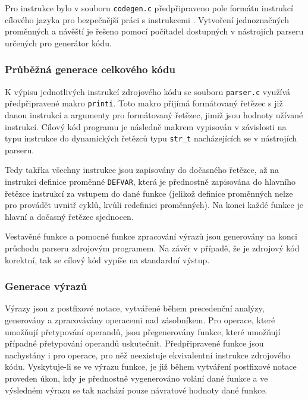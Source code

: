 \documentclass[a4paper, 11pt]{article}
\begin{document}
Pro instrukce bylo v souboru \verb|codegen.c| předpřipraveno pole formátu instrukcí cílového jazyka pro bezpečnější práci s instrukcemi  \cite{el-husa}. 
Vytvoření jednoznačných proměnných a návěští je řešeno pomocí počítadel dostupných v nástrojích parseru určených pro generátor kódu.

\subsubsection{Průběžná generace celkového kódu}

K výpisu jednotlivých instrukcí zdrojového kódu se souboru \verb|parser.c| využívá předpřipravené makro \verb|printi|. 
Toto makro přijímá formátovaný řetězec s již danou instrukcí a argumenty pro formátovaný řetězec, jimiž jsou hodnoty užívané instrukcí. 
Cílový kód programu je následně makrem vypisován v závislosti na typu instrukce do dynamických řetězců typu \verb|str_t| nacházejících se v nástrojích parseru. 

Tedy takřka všechny instrukce jsou zapisovány do dočasného řetězce, až na instrukci definice proměnné \verb|DEFVAR|, která je přednostně zapisována do hlavního řetězce instrukcí za vstupem do dané funkce (jelikož definice proměnných nelze pro provádět uvnitř cyklů, kvůli redefinici proměnných). 
Na konci každé funkce je hlavní a dočasný řetězec sjednocen. 

Vestavěné funkce a pomocné funkce zpracování výrazů jsou generovány na konci průchodu parseru zdrojovým programem. 
Na závěr v případě, že je zdrojový kód korektní, tak se cílový kód vypíše na standardní výstup.

\subsubsection{Generace výrazů}

Výrazy jsou z postfixové notace, vytvářené během precedenční analýzy, generovány a zpracovávány operacemi nad zásobníkem. 
Pro operace, které umožňují přetypování operandů, jsou přegenerovány funkce, které umožňují případné přetypování operandů uskutečnit. 
Předpřipravené funkce jsou nachystány i pro operace, pro něž neexistuje ekvivalentní instrukce zdrojového kódu. 
Vyskytuje-li se ve výrazu funkce, je již během vytváření postfixové notace proveden úkon, kdy je přednostně vygenerováno volání dané funkce a ve výsledném výrazu se tak nachází pouze návratové hodnoty dané funkce.

\end{document}
